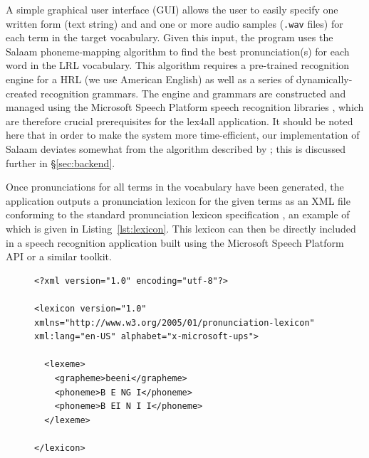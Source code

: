 \documentclass[11pt]{article}
\begin{document}
A simple graphical user interface (GUI) allows the user to easily specify one written form (text string) and and one or more audio samples (\texttt{.wav} files) for each term in the target vocabulary.
Given this input, the program uses the Salaam phoneme-mapping algorithm \cite{Qiao10,Chan12} to find the best pronunciation(s) for each word in the LRL vocabulary. This algorithm requires a pre-trained recognition engine for a HRL (we use American English) as well as a series of dynamically-created recognition grammars. The engine and grammars are constructed and managed using the Microsoft Speech Platform speech recognition libraries \cite{mspsdk}, which are therefore crucial prerequisites for the lex4all application. It should be noted here that in order to make the system more time-efficient, our implementation of Salaam deviates somewhat from the algorithm described by ; this is discussed further in \S\ref{sec:backend}. 

Once pronunciations for all terms in the vocabulary have been generated, the application outputs a pronunciation lexicon for the given terms as an XML file conforming to the standard pronunciation lexicon specification \cite{pls}, an example of which is given in Listing~\ref{lst:lexicon}. This lexicon can then be directly included in a speech recognition application built using the Microsoft Speech Platform API or a similar toolkit.





\begin{figure}
\begin{lstlisting}[caption=Sample lexicon mapping the Yoruba word \textit{beeni} (``yes'') to two possible sequences of American English phonemes., label=lst:lexicon]
<?xml version="1.0" encoding="utf-8"?>
	  
<lexicon version="1.0" xmlns="http://www.w3.org/2005/01/pronunciation-lexicon" xml:lang="en-US" alphabet="x-microsoft-ups">
		 
  <lexeme>
    <grapheme>beeni</grapheme>
    <phoneme>B E NG I</phoneme>
    <phoneme>B EI N I I</phoneme>
  </lexeme>
  
</lexicon>
\end{lstlisting}
\end{figure}
\end{document}
